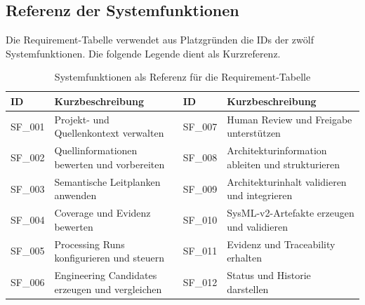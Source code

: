 \subsection{Referenz der Systemfunktionen}

Die Requirement-Tabelle verwendet aus Platzgründen die IDs der zwölf
Systemfunktionen. Die folgende Legende dient als Kurzreferenz.

\begin{table}[htbp]
\centering
\caption{Systemfunktionen als Referenz für die Requirement-Tabelle}
\label{tab:sr_function_reference}
\begin{tabular}{p{1.7cm}p{6.0cm}p{1.7cm}p{6.0cm}}
\toprule
\textbf{ID} & \textbf{Kurzbeschreibung} & \textbf{ID} & \textbf{Kurzbeschreibung} \\
\midrule
SF\_001 & Projekt- und Quellenkontext verwalten & SF\_007 & Human Review und Freigabe unterstützen \\
SF\_002 & Quellinformationen bewerten und vorbereiten & SF\_008 & Architekturinformation ableiten und strukturieren \\
SF\_003 & Semantische Leitplanken anwenden & SF\_009 & Architekturinhalt validieren und integrieren \\
SF\_004 & Coverage und Evidenz bewerten & SF\_010 & SysML-v2-Artefakte erzeugen und validieren \\
SF\_005 & Processing Runs konfigurieren und steuern & SF\_011 & Evidenz und Traceability erhalten \\
SF\_006 & Engineering Candidates erzeugen und vergleichen & SF\_012 & Status und Historie darstellen \\
\bottomrule
\end{tabular}
\end{table}

